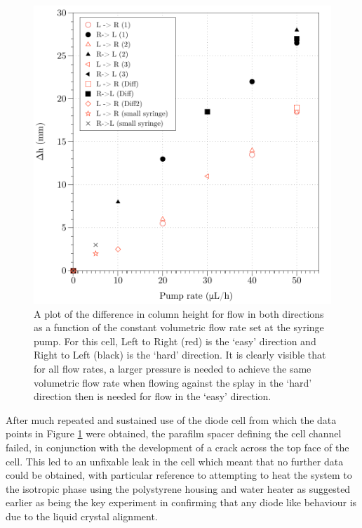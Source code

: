 \begin{figure}
\begin{center}
\includegraphics{Figures/Diode/first_diode/difference}
\end{center}
\caption[Difference in column heights as a function of flow rate for both directions (first diode behaviour)]{\label{fig:first_diode_main_graph}A plot of the difference in column height for flow in both directions as a function of the constant volumetric flow rate set at the syringe pump. For this cell, Left to Right (red) is the `easy' direction and Right to Left (black) is the `hard' direction. It is clearly visible that for all flow rates, a larger pressure is needed to achieve the same volumetric flow rate when flowing against the splay in the `hard' direction then is needed for flow in the `easy' direction.}
\end{figure}

After much repeated and sustained use of the diode cell from which the data points in Figure \ref{fig:first_diode_main_graph} were obtained, the parafilm spacer defining the cell channel failed, in conjunction with the development of a crack across the top face of the cell. This led to an unfixable leak in the cell which meant that no further data could be obtained, with particular reference to attempting to heat the system to the isotropic phase using the polystyrene housing and water heater as suggested earlier as being the key experiment in confirming that any diode like behaviour is due to the liquid crystal alignment.

